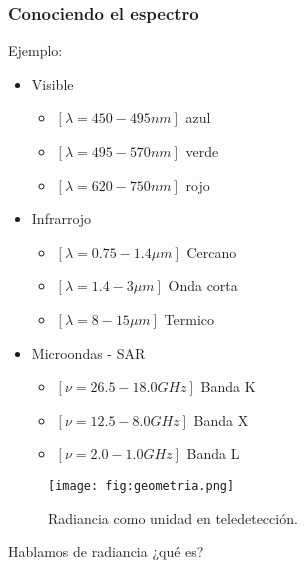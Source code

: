 \begin{frame}
  \frametitle{Conociendo el espectro}
  \begin{exampleblock}{Ejemplo:}
    \begin{itemize}
      \item<1,4> Visible
      \begin{itemize}
        \item<1,4> $[\lambda=450-495 nm]$ {\color{blue} azul}
        \item<1,4> $[\lambda=495-570 nm]$ {\color{green} verde}
        \item<1,4> $[\lambda=620-750 nm]$ {\color{red} rojo}
      \end{itemize}
      \item<2,4> Infrarrojo
      \begin{itemize}
        \item<2,4> $[\lambda=0.75-1.4\mu m]$ Cercano
        \item<2,4> $[\lambda=1.4-3\mu m]$ Onda corta
        \item<2,4> $[\lambda=8-15\mu m]$ Termico
      \end{itemize}
      \item<3,4> Microondas - SAR
      \begin{itemize}
        \item<3,4> $[\nu = 26.5 -18.0 GHz]$ Banda K
        \item<3,4> $[\nu = 12.5 - 8.0 GHz]$ Banda X
        \item<3,4> $[\nu = 2.0 - 1.0 GHz] $ Banda L
      \end{itemize}
    \end{itemize}
  \end{exampleblock}
\end{frame}


\begin{frame}{}
  \begin{figure}
    \centering
    \texttt{[image: fig:geometria.png]}
    \caption{Radiancia como unidad en teledetección.}
    \label{}
  \end{figure}
\end{frame}
\begin {frame}
\begin{block}{Hablamos de radiancia}
      ¿qué es?
               \end{block}
\end{frame}

